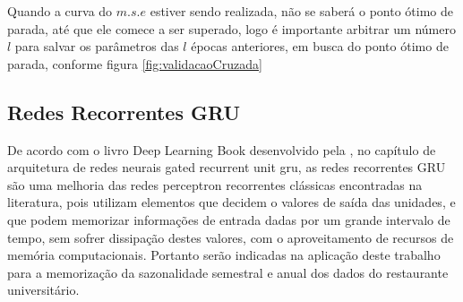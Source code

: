 \documentclass[	12pt, Times, openright, twoside, a4paper, english, brazil]{abntex2}
\begin{document}
                Quando a curva do $m.s.e$ estiver sendo realizada, não se saberá o ponto ótimo de parada, até que ele comece a ser superado, logo é importante arbitrar um número $l$ para salvar os parâmetros das $l$ épocas anteriores, em busca do ponto ótimo de parada, conforme figura \ref{fig:validacaoCruzada}
        
        \subsection{Redes Recorrentes GRU}
         	De acordo com  o livro Deep Learning Book desenvolvido pela  \cite{DLB}, no capítulo de arquitetura de redes neurais gated recurrent unit gru, as redes recorrentes GRU são uma melhoria das redes perceptron recorrentes clássicas encontradas na literatura, pois utilizam elementos que decidem o valores de saída das unidades, e que podem memorizar informações de entrada dadas por um grande intervalo de tempo, sem sofrer dissipação destes valores, com o aproveitamento de recursos de memória computacionais. Portanto serão indicadas na aplicação deste trabalho para a memorização da sazonalidade semestral e anual dos dados do restaurante universitário.
            \begin{figure}[H]
            \end{figure}
\end{document}
